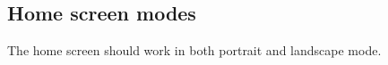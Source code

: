 \subsection*{Home screen modes}
\label{backlog:home_screen_modes}
The home screen should work in both portrait and landscape mode.